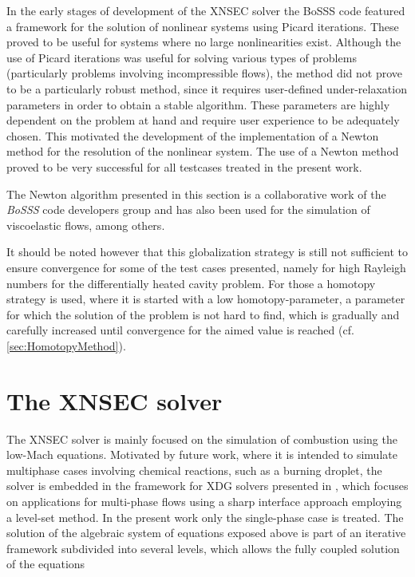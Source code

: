 In the early stages of development of the XNSEC solver the BoSSS code featured a framework for the solution of nonlinear systems using Picard iterations. These proved to be useful for systems where no large nonlinearities exist. Although the use of Picard iterations was useful for solving various types of problems (particularly problems involving incompressible flows), the method did not prove to be a particularly robust method, since it requires user-defined under-relaxation parameters in order to obtain a stable algorithm. These parameters are highly dependent on the problem at hand and require user experience to be adequately chosen.
This motivated the development of the implementation of a Newton method for the resolution of the nonlinear system. The use of a Newton method proved to be very successful for all testcases treated in the present work. 

The Newton algorithm presented in this section is a collaborative work of the \textit{BoSSS}  code developers group and has also been used for the simulation of viscoelastic \parencite{kikkerFullyCoupledHighorder} flows, among others.


It should be noted however that this globalization strategy is still not sufficient to ensure convergence for some of the test cases presented, namely for high Rayleigh numbers for the differentially heated cavity problem. For those a homotopy strategy is used, where it is started with a low homotopy-parameter, a parameter for which the solution of the problem is not hard to find, which is gradually and carefully increased until convergence for the aimed value is reached (cf. \cref{sec:HomotopyMethod}).




\section{The XNSEC solver}
The XNSEC solver is mainly focused on the simulation of combustion using the low-Mach equations. Motivated by future work, where it is intended to simulate multiphase cases involving chemical reactions, such as a burning droplet, the solver is embedded in the framework for \gls{XDG} solvers presented in \textcite{kummerExtendedDiscontinuousGalerkin2017}, which focuses on applications for multi-phase flows using a sharp interface approach employing a level-set method.  In the present work only the single-phase case is treated. The solution of the algebraic system of equations exposed above is part of an iterative framework subdivided into several levels, which allows the fully coupled solution of the equations

